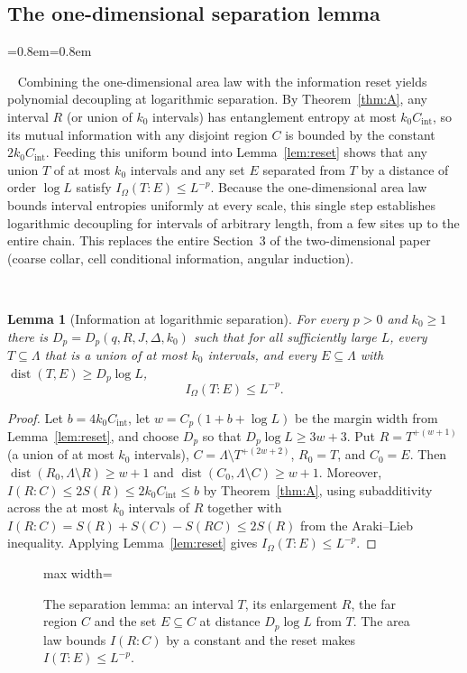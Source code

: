 \documentclass[aps,prx,reprint,superscriptaddress,floatfix,nofootinbib,longbibliography,amsmath,amssymb]{revtex4-2}
\newcommand{\dist}{\operatorname{dist}}
\newcommand{\Om}{\Omega}
\newcommand{\Lam}{\Lambda}
\theoremstyle{plain}
\newtheorem{lemma}[theorem]{Lemma}
\theoremstyle{definition}
\newenvironment{inwords}{%
  \par\medskip\noindent
  \begin{list}{}{\leftmargin=0.8em\rightmargin=0.8em}
  \item\relax
  \noindent{\sffamily\bfseries\color{blue!40!black}In words.}\ \sffamily\small}{%
  \end{list}\par\medskip}
\newcommand{\precisely}{\par\noindent{\bfseries Precisely.}\ }
\begin{document}
\subsection{The one-dimensional separation lemma}\label{sec:logsep2}

\begin{inwords}
Combining the one-dimensional area law with the information reset yields
polynomial decoupling at logarithmic separation. By Theorem~\ref{thm:A}, any
interval $R$ (or union of $k_0$ intervals) has entanglement entropy at most
$k_0C_{\mathrm{int}}$, so its mutual information with any disjoint region $C$
is bounded by the constant $2k_0C_{\mathrm{int}}$. Feeding this uniform bound
into Lemma~\ref{lem:reset} shows that any union $T$ of at most $k_0$ intervals
and any set $E$ separated from $T$ by a distance of order $\log L$ satisfy
$I_\Om(T:E)\le L^{-p}$. Because the one-dimensional area law bounds interval
entropies uniformly at every scale, this single step establishes logarithmic
decoupling for intervals of arbitrary length, from a few sites up to the
entire chain. This replaces the entire Section~3 of the two-dimensional
paper (coarse collar, cell conditional information, angular induction).
\end{inwords}

\precisely
\begin{lemma}[Information at logarithmic separation]\label{lem:logsep}
For every $p>0$ and $k_0\ge1$ there is $D_p=D_p(q,R,J,\Delta,k_0)$ such that for
all sufficiently large $L$, every $T\subseteq\Lam$ that is a union of at most
$k_0$ intervals, and every $E\subseteq\Lam$ with $\dist(T,E)\ge D_p\log L$,
\[
 I_\Om(T:E)\le L^{-p}.
\]
\end{lemma}
\begin{proof}
Let $b=4k_0C_{\mathrm{int}}$, let $w=C_p(1+b+\log L)$ be the margin width from Lemma~\ref{lem:reset},
and choose $D_p$ so that $D_p\log L\ge 3w+3$. Put $R=T^{+(w+1)}$ (a union of at most $k_0$
intervals), $C=\Lam\setminus T^{+(2w+2)}$, $R_0=T$, and $C_0=E$. Then
$\dist(R_0,\Lam\setminus R)\ge w+1$ and $\dist(C_0,\Lam\setminus C)\ge w+1$. Moreover,
$I(R:C)\le 2S(R)\le 2k_0C_{\mathrm{int}}\le b$ by Theorem~\ref{thm:A},
using subadditivity across the at most $k_0$ intervals of $R$ together with
$I(R:C)=S(R)+S(C)-S(RC)\le 2S(R)$ from the Araki--Lieb inequality.
Applying Lemma~\ref{lem:reset} gives $I_\Om(T:E)\le L^{-p}$.
\end{proof}

\begin{figure}[t]
\centering
\begin{adjustbox}{max width=\linewidth}

\end{adjustbox}
\caption{The separation lemma: an interval $T$, its enlargement $R$, the far region $C$ and the set $E\subseteq C$ at distance $D_p\log L$ from $T$. The area law bounds $I(R:C)$ by a constant and the reset makes $I(T:E)\le L^{-p}$.}\label{fig:chain-logsep}
\end{figure}
\end{document}
